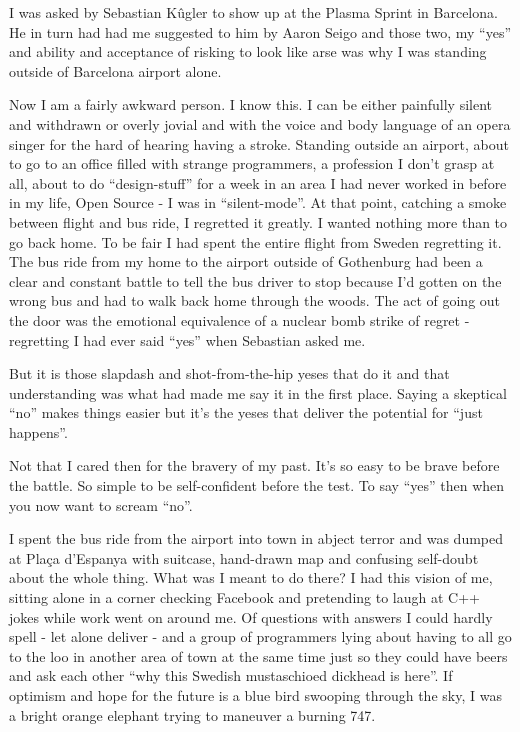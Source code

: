 I was asked by Sebastian Kûgler to show up at the Plasma Sprint in Barcelona. He in turn had had me suggested to him by Aaron Seigo and those two, my “yes” and ability and acceptance of risking to look like arse was why I was standing outside of Barcelona airport alone.

Now I am a fairly awkward person. I know this. I can be either painfully silent and withdrawn or overly jovial and with the voice and body language of an opera singer for the hard of hearing having a stroke. Standing outside an airport, about to go to an office filled with strange programmers, a profession I don't grasp at all, about to do “design-stuff” for a week in an area I had never worked in before in my life, Open Source - I was in “silent-mode”. 
At that point, catching a smoke between flight and bus ride, I regretted it greatly. I wanted nothing more than to go back home. To be fair I had spent the entire flight from Sweden regretting it. The bus ride from my home to the airport outside of Gothenburg had been a clear and constant battle to tell the bus driver to stop because I'd gotten on the wrong bus and had to walk back home through the woods. The act of going out the door was the emotional equivalence of a nuclear bomb strike of regret - regretting I had ever said “yes” when Sebastian asked me.

But it is those slapdash and shot-from-the-hip yeses that do it and that understanding was what had made me say it in the first place. Saying a skeptical “no” makes things easier but it's the yeses that deliver the potential for “just happens”.

Not that I cared then for the bravery of my past. It's so easy to be brave before the battle. So simple to be self-confident before the test. To say “yes” then when you now want to scream “no”.

I spent the bus ride from the airport into town in abject terror and was dumped at Plaça d'Espanya with suitcase, hand-drawn map and confusing self-doubt about the whole thing.
What was I meant to do there? I had this vision of me, sitting alone in a corner checking Facebook and pretending to laugh at C++ jokes while work went on around me. Of questions with answers I could hardly spell - let alone deliver - and a group of programmers lying about having to all go to the loo in another area of town at the same time just so they could have beers and ask each other “why this Swedish mustaschioed dickhead is here”. If optimism and hope for the future is a blue bird swooping through the sky, I was a bright orange elephant trying to maneuver a burning 747.

